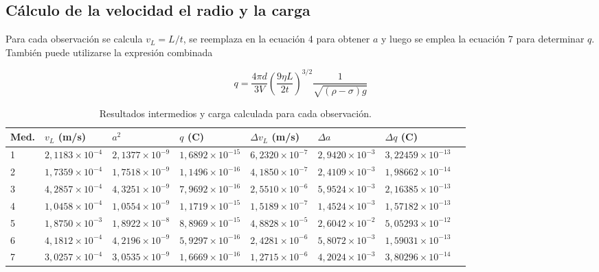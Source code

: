 \documentclass{article}
\begin{document}
\subsection{Cálculo de la velocidad el radio y la carga}

Para cada observación se calcula $v_L=L/t$, se reemplaza en la ecuación 4 para obtener $a$ y luego se emplea la ecuación 7 para determinar $q$. También puede utilizarse la expresión combinada

\begin{equation}
q=\frac{4\pi d}{3V}\left(\frac{9\eta L}{2t}\right)^{3/2}\frac{1}{\sqrt{(\rho-\sigma)g}}
\end{equation}

\begin{table}[H]
\centering
\scriptsize
\caption{Resultados intermedios y carga calculada para cada observación.}
\begin{tabular}{@{}C{0.8cm}C{1.9cm}C{1.7cm}C{1.9cm}C{1.9cm}C{1.8cm}C{1.9cm}C{0.8cm}@{}}
    \toprule
    \textbf{Med.} & \textbf{$v_L$ (m/s)} & \textbf{$a^2$} & \textbf{$q$ (C)} & \textbf{$\Delta v_L$ (m/s)} & \textbf{$\Delta a$} & \textbf{$\Delta q$ (C)} \\
      & $2{,}1183\times10^{-4}$ & $2{,}1377\times10^{-9}$ & $1{,}6892\times10^{-15}$ & $6{,}2320\times10^{-7}$ & $2{,}9420\times10^{-3}$ & $3{,}22459\times10^{-13}$ \\
    2  & $1{,}7359\times10^{-4}$ & $1{,}7518\times10^{-9}$ & $1{,}1496\times10^{-16}$ & $4{,}1850\times10^{-7}$ & $2{,}4109\times10^{-3}$ & $1{,}98662\times10^{-14}$ \\
    3  & $4{,}2857\times10^{-4}$ & $4{,}3251\times10^{-9}$ & $7{,}9692\times10^{-16}$ & $2{,}5510\times10^{-6}$ & $5{,}9524\times10^{-3}$ & $2{,}16385\times10^{-13}$ \\
    4  & $1{,}0458\times10^{-4}$ & $1{,}0554\times10^{-9}$ & $1{,}1719\times10^{-15}$ & $1{,}5189\times10^{-7}$ & $1{,}4524\times10^{-3}$ & $1{,}57182\times10^{-13}$ \\
    5  & $1{,}8750\times10^{-3}$ & $1{,}8922\times10^{-8}$ & $8{,}8969\times10^{-15}$ & $4{,}8828\times10^{-5}$ & $2{,}6042\times10^{-2}$ & $5{,}05293\times10^{-12}$ \\
    6  & $4{,}1812\times10^{-4}$ & $4{,}2196\times10^{-9}$ & $5{,}9297\times10^{-16}$ & $2{,}4281\times10^{-6}$ & $5{,}8072\times10^{-3}$ & $1{,}59031\times10^{-13}$ \\
    7  & $3{,}0257\times10^{-4}$ & $3{,}0535\times10^{-9}$ & $1{,}6669\times10^{-16}$ & $1{,}2715\times10^{-6}$ & $4{,}2024\times10^{-3}$ & $3{,}80296\times10^{-14}$ \\

\end{tabular}
\end{table}
\end{document}
